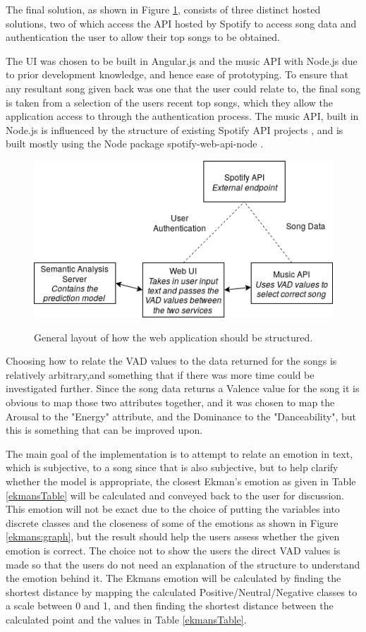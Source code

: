 The final solution, as shown in Figure \ref{implementationLayout}, consists of three distinct hosted solutions, two of which access the API hosted by Spotify to access song data and authentication the user to allow their top songs to be obtained.

The UI was chosen to be built in Angular.js and the music API with Node.js due to prior development knowledge, and hence ease of prototyping. 
To ensure that any resultant song given back was one that the user could relate to, the final song is taken from a selection of the users recent top songs, which they allow the application access to through the authentication process.
The music API, built in Node.js is influenced by the structure of existing Spotify API projects \cite{moodtape}, and is built mostly using the Node package spotify-web-api-node \cite{nodeSpotify}.

\begin{figure}[ht]
\caption{General layout of how the web application should be structured.}
\centering
\includegraphics[scale=0.6]{litImgs/interfaceLayout.png}
\label{implementationLayout}
\end{figure}

Choosing how to relate the VAD values to the data returned for the songs is relatively arbitrary,and something that if there was more time could be investigated further. Since the song data returns a Valence value for the song it is obvious to map those two attributes together, and it was chosen to map the Arousal to the "Energy" attribute, and the Dominance to the "Danceability", but this is something that can be improved upon.

The main goal of the implementation is to attempt to relate an emotion in text, which is subjective, to a song since that is also subjective, but to help clarify whether the model is appropriate, the closest Ekman's emotion as given in Table \ref{ekmansTable} will be calculated and conveyed back to the user for discussion. This emotion will not be exact due to the choice of putting the variables into discrete classes and the closeness of some of the emotions as shown in Figure \ref{ekmans:graph}, but the result should help the users assess whether the given emotion is correct. The choice not to show the users the direct VAD values is made so that the users do not need an explanation of the structure to understand the emotion behind it. The Ekmans emotion will be calculated by finding the shortest distance by mapping the calculated Positive/Neutral/Negative classes to a scale between 0 and 1, and then finding the shortest distance between the calculated point and the values in Table \ref{ekmansTable}.

